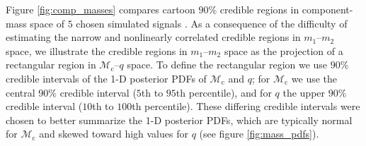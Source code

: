 Figure \ref{fig:comp_masses} compares cartoon $90\%$ credible regions in component-mass space of $5$ chosen simulated signals \citep[cf.][figure 1]{Chatziioannou_2014}.  As a consequence of the difficulty of estimating the narrow and nonlinearly correlated credible regions in $m_1$--$m_2$ space, we illustrate the credible regions in $m_1$--$m_2$ space as the projection of a rectangular region in $\mathcal{M}_\mathrm{c}$--$q$ space.  To define the rectangular region we use $90\%$ credible intervals of the 1-D posterior PDFs of $\mathcal{M}_\mathrm{c}$ and $q$; for $\mathcal{M}_\mathrm{c}$ we use the central $90\%$ credible interval ($5$th to $95$th percentile), and for $q$ the upper $90\%$ credible interval ($10$th to $100$th percentile).  These differing credible intervals were chosen to better summarize the 1-D posterior PDFs, which are typically normal for $\mathcal{M}_\mathrm{c}$ and skewed toward high values for $q$ (see figure \ref{fig:mass_pdfs}).